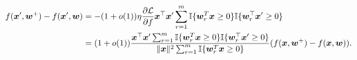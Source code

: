 \begin{equation}\nonumber\label{eq:dnn_diffxx}
\begin{aligned}
f(\bm{x}', \bm{w}^+) - f(\bm{x}', \bm{w}) &= - (1 + o(1)) \eta \frac{\partial \mathcal{L}}{\partial f}\bm{x}^\top \bm{x}'  \sum_{r=1}^m \mathbb{I}\{\bm{w}_r^T \bm{x} \ge 0\} \mathbb{I}\{\bm{w}_r^\top \bm{x}' \ge 0\}\\
&= (1 + o(1)) \frac{\bm{x}^\top \bm{x}'  \sum_{r=1}^m \mathbb{I}\{\bm{w}_r^T \bm{x} \ge 0\} \mathbb{I}\{\bm{w}_r^\top \bm{x}' \ge 0\}}{\|\bm{x}\|^2  \sum_{r=1}^m \mathbb{I}\{\bm{w}_r^T \bm{x} \ge 0\}} (f(\bm{x}, \bm{w}^+) - f(\bm{x}, \bm{w})).
\end{aligned}
\end{equation}

